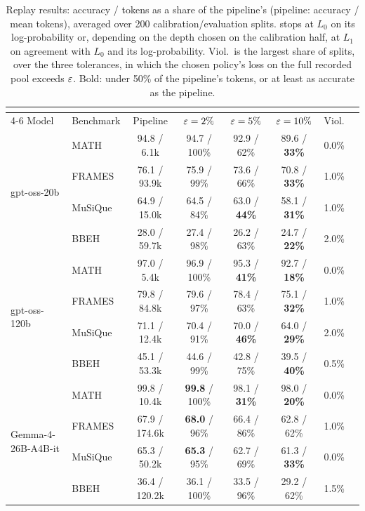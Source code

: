 \begin{table}[t]
\centering
\small
\begin{tabular*}{\textwidth}{@{\extracolsep{\fill}}llcccccc@{}}
\toprule
& & & \multicolumn{3}{c}{\climb{}} & \\
\cmidrule(lr){4-6}
Model & Benchmark & Pipeline & $\varepsilon = 2\%$ & $\varepsilon = 5\%$ & $\varepsilon = 10\%$ & Viol. \\
\midrule
\multirow{4}{*}{gpt-oss-20b} & MATH & 94.8 / 6.1k & 94.7 / 100\% & 92.9 / 62\% & 89.6 / \textbf{33\%} & 0.0\% \\
 & FRAMES & 76.1 / 93.9k & 75.9 / 99\% & 73.6 / 66\% & 70.8 / \textbf{33\%} & 1.0\% \\
 & MuSiQue & 64.9 / 15.0k & 64.5 / 84\% & 63.0 / \textbf{44\%} & 58.1 / \textbf{31\%} & 1.0\% \\
 & BBEH & 28.0 / 59.7k & 27.4 / 98\% & 26.2 / 63\% & 24.7 / \textbf{22\%} & 2.0\% \\
\midrule
\multirow{4}{*}{gpt-oss-120b} & MATH & 97.0 / 5.4k & 96.9 / 100\% & 95.3 / \textbf{41\%} & 92.7 / \textbf{18\%} & 0.0\% \\
 & FRAMES & 79.8 / 84.8k & 79.6 / 97\% & 78.4 / 63\% & 75.1 / \textbf{32\%} & 1.0\% \\
 & MuSiQue & 71.1 / 12.4k & 70.4 / 91\% & 70.0 / \textbf{46\%} & 64.0 / \textbf{29\%} & 2.0\% \\
 & BBEH & 45.1 / 53.3k & 44.6 / 99\% & 42.8 / 75\% & 39.5 / \textbf{40\%} & 0.5\% \\
\midrule
\multirow{4}{*}{Gemma-4-26B-A4B-it} & MATH & 99.8 / 10.4k & \textbf{99.8} / 100\% & 98.1 / \textbf{31\%} & 98.0 / \textbf{20\%} & 0.0\% \\
 & FRAMES & 67.9 / 174.6k & \textbf{68.0} / 96\% & 66.4 / 86\% & 62.8 / 62\% & 1.0\% \\
 & MuSiQue & 65.3 / 50.2k & \textbf{65.3} / 95\% & 62.7 / 69\% & 61.3 / \textbf{33\%} & 0.0\% \\
 & BBEH & 36.4 / 120.2k & 36.1 / 100\% & 33.5 / 96\% & 29.2 / 62\% & 1.5\% \\
\bottomrule
\end{tabular*}
\caption{Replay results: accuracy / tokens as a share of the pipeline's (pipeline: accuracy / mean tokens), averaged over
200 calibration/evaluation splits. \climb{} stops at $L_0$ on its log-probability or, depending on the depth chosen on the calibration half, at $L_1$ on agreement with $L_0$ and
its log-probability. Viol.\ is the largest share of splits, over the three
tolerances, in which the chosen policy's loss on the full recorded pool exceeds $\varepsilon$. Bold: under 50\% of the pipeline's
tokens, or at least as accurate as the pipeline.}
\label{tab:main}
\end{table}
